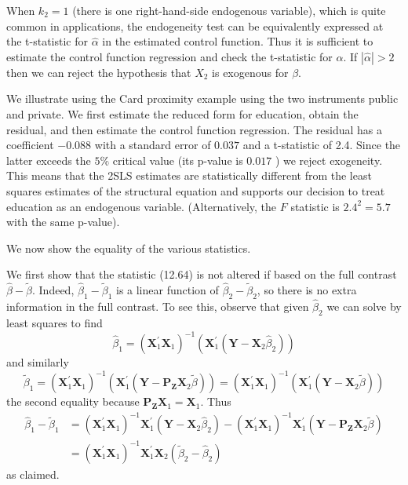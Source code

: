 \documentclass[10pt]{article}
\begin{document}
When $k_{2}=1$ (there is one right-hand-side endogenous variable), which is quite common in applications, the endogeneity test can be equivalently expressed at the t-statistic for $\widehat{\alpha}$ in the estimated control function. Thus it is sufficient to estimate the control function regression and check the t-statistic for $\widehat{\alpha}$. If $|\widehat{\alpha}|>2$ then we can reject the hypothesis that $X_{2}$ is exogenous for $\beta$.

We illustrate using the Card proximity example using the two instruments public and private. We first estimate the reduced form for education, obtain the residual, and then estimate the control function regression. The residual has a coefficient $-0.088$ with a standard error of $0.037$ and a t-statistic of 2.4. Since the latter exceeds the $5 \%$ critical value (its p-value is $0.017$ ) we reject exogeneity. This means that the 2SLS estimates are statistically different from the least squares estimates of the structural equation and supports our decision to treat education as an endogenous variable. (Alternatively, the $F$ statistic is $2.4^{2}=5.7$ with the same p-value).

We now show the equality of the various statistics.

We first show that the statistic (12.64) is not altered if based on the full contrast $\widehat{\beta}-\widetilde{\beta}$. Indeed, $\widehat{\beta}_{1}-\widetilde{\beta}_{1}$ is a linear function of $\widehat{\beta}_{2}-\widetilde{\beta}_{2}$, so there is no extra information in the full contrast. To see this, observe that given $\widehat{\beta}_{2}$ we can solve by least squares to find
$$
\widehat{\beta}_{1}=\left(\boldsymbol{X}_{1}^{\prime} \boldsymbol{X}_{1}\right)^{-1}\left(\boldsymbol{X}_{1}^{\prime}\left(\boldsymbol{Y}-\boldsymbol{X}_{2} \widehat{\beta}_{2}\right)\right)
$$
and similarly
$$
\widetilde{\beta}_{1}=\left(\boldsymbol{X}_{1}^{\prime} \boldsymbol{X}_{1}\right)^{-1}\left(\boldsymbol{X}_{1}^{\prime}\left(\boldsymbol{Y}-\boldsymbol{P}_{\boldsymbol{Z}} \boldsymbol{X}_{2} \widetilde{\beta}\right)\right)=\left(\boldsymbol{X}_{1}^{\prime} \boldsymbol{X}_{1}\right)^{-1}\left(\boldsymbol{X}_{1}^{\prime}\left(\boldsymbol{Y}-\boldsymbol{X}_{2} \widetilde{\beta}\right)\right)
$$
the second equality because $\boldsymbol{P}_{\boldsymbol{Z}} \boldsymbol{X}_{1}=\boldsymbol{X}_{1}$. Thus
$$
\begin{aligned}
\widehat{\beta}_{1}-\widetilde{\beta}_{1} &=\left(\boldsymbol{X}_{1}^{\prime} \boldsymbol{X}_{1}\right)^{-1} \boldsymbol{X}_{1}^{\prime}\left(\boldsymbol{Y}-\boldsymbol{X}_{2} \widehat{\beta}_{2}\right)-\left(\boldsymbol{X}_{1}^{\prime} \boldsymbol{X}_{1}\right)^{-1} \boldsymbol{X}_{1}^{\prime}\left(\boldsymbol{Y}-\boldsymbol{P}_{\boldsymbol{Z}} \boldsymbol{X}_{2} \widetilde{\beta}\right) \\
&=\left(\boldsymbol{X}_{1}^{\prime} \boldsymbol{X}_{1}\right)^{-1} \boldsymbol{X}_{1}^{\prime} \boldsymbol{X}_{2}\left(\widetilde{\beta}_{2}-\widehat{\beta}_{2}\right)
\end{aligned}
$$
as claimed.
\end{document}
